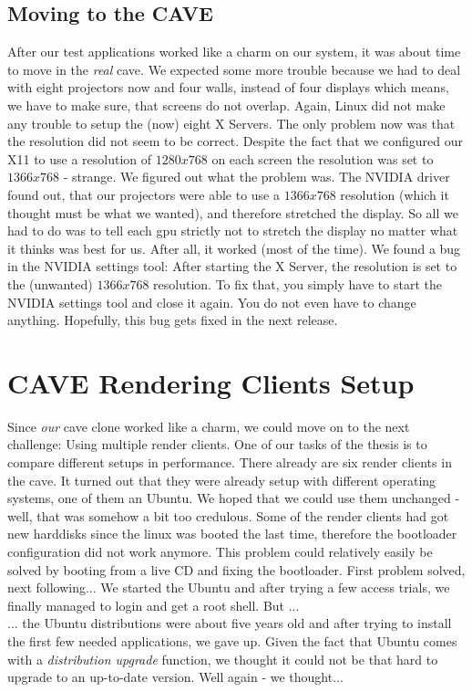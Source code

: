 \subsection{Moving to the CAVE}
After our test applications worked like a charm on our system, it was about time to move in the \emph{real} \gls{cave}. We expected some more trouble because we had to deal with eight projectors now and four walls, instead of four displays which means, we have to make sure, that screens do not overlap. Again, Linux did not make any trouble to setup the (now) eight X Servers. The only problem now was that the resolution did not seem to be correct. Despite the fact that we configured our X11 to use a resolution of $1280x768$ on each screen the resolution was set to $1366x768$ - strange. We figured out what the problem was. The NVIDIA driver found out, that our projectors were able to use a $1366x768$ resolution (which it thought must be what we wanted), and therefore stretched the display. So all we had to do was to tell each \gls{gpu} strictly not to stretch the display no matter what it thinks was best for us. After all, it worked (most of the time). We found a bug in the NVIDIA settings tool: After starting the X Server, the resolution is set to the (unwanted) $1366x768$ resolution. To fix that, you simply have to start the NVIDIA settings tool and close it again. You do not even have to change anything. Hopefully, this bug gets fixed in the next release.


\section{CAVE Rendering Clients Setup}
Since \emph{our} \gls{cave} clone worked like a charm, we could move on to the next challenge: Using multiple render clients. One of our tasks of the thesis is to compare different setups in performance. There already are six render clients in the \gls{cave}. It turned out that they were already setup with different operating systems, one of them an Ubuntu. We hoped that we could use them unchanged - well, that was somehow a bit too credulous. 
Some of the render clients had got new harddisks since the linux was booted the last time, therefore the bootloader configuration did not work anymore. This problem could relatively easily be solved by booting from a live CD and fixing the bootloader. First problem solved, next following... 
We started the Ubuntu and after trying a few access trials, we finally managed to login and get a root shell. But ... \\
... the Ubuntu distributions were about five years old and after trying to install the first few needed applications, we gave up. Given the fact that Ubuntu comes with a \emph{distribution upgrade} function, we thought it could not be that hard to upgrade to an up-to-date version. Well again - we thought... \\

